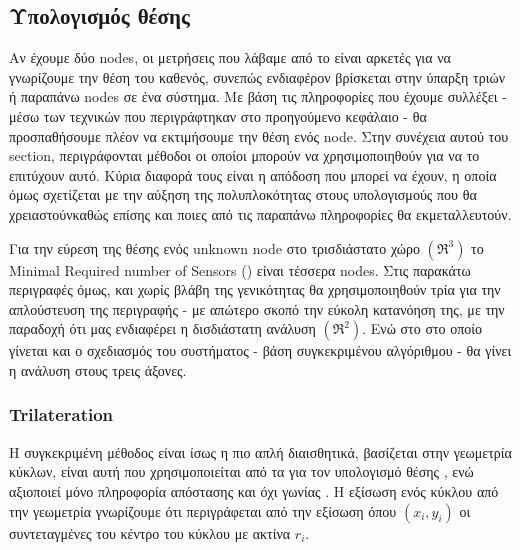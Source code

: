 \subsection{Υπολογισμός θέσης} \label{sec:Chapter3-2} %
Αν έχουμε δύο nodes, οι μετρήσεις που λάβαμε από το  είναι αρκετές για να γνωρίζουμε την θέση του καθενός,
συνεπώς ενδιαφέρον βρίσκεται στην ύπαρξη τριών ή παραπάνω nodes σε ένα σύστημα. Με βάση τις πληροφορίες που έχουμε συλλέξει - μέσω των τεχνικών που 
περιγράφτηκαν στο προηγούμενο κεφάλαιο - θα προσπαθήσουμε πλέον να εκτιμήσουμε την θέση ενός node. Στην συνέχεια αυτού του section, περιγράφονται μέθοδοι οι οποίοι μπορούν να χρησιμοποιηθούν για να το επιτύχουν
αυτό. Κύρια διαφορά τους είναι η απόδοση που μπορεί να έχουν, η οποία όμως σχετίζεται με την αύξηση της πολυπλοκότητας στους υπολογισμούς που θα
χρειαστούν\udot καθώς επίσης και ποιες από τις παραπάνω πληροφορίες θα εκμεταλλευτούν. 

Για την εύρεση της θέσης ενός unknown node στο τρισδιάστατο χώρο $(\mathfrak{R}^3)$ το Minimal Required number of Sensors () είναι τέσσερα nodes.
Στις παρακάτω περιγραφές όμως, και χωρίς βλάβη της γενικότητας θα χρησιμοποιηθούν τρία για την απλούστευση της περιγραφής - με απώτερο σκοπό την εύκολη κατανόηση της, με την παραδοχή ότι μας
ενδιαφέρει η δισδιάστατη ανάλυση $(\mathfrak{R}^2)$. Ενώ στο  στο οποίο γίνεται και ο σχεδιασμός του συστήματος - βάση συγκεκριμένου αλγόριθμου - 
θα γίνει η ανάλυση στους τρεις άξονες.

\subsubsection{Trilateration}\label{sec:trilateration}
Η συγκεκριμένη μέθοδος είναι ίσως η πιο απλή διαισθητικά, βασίζεται στην γεωμετρία κύκλων, είναι αυτή που χρησιμοποιείται από τα 
για τον υπολογισμό θέσης \cite{trilateration-vs-triangulation-video}, ενώ αξιοποιεί μόνο πληροφορία απόστασης και όχι γωνίας \cite{Trilateration-vs-Triangulation}.
Η εξίσωση ενός κύκλου από την γεωμετρία γνωρίζουμε ότι περιγράφεται από την εξίσωση  όπου $(x_i,y_i)$ οι συντεταγμένες
του κέντρο του κύκλου με ακτίνα $r_i$.

